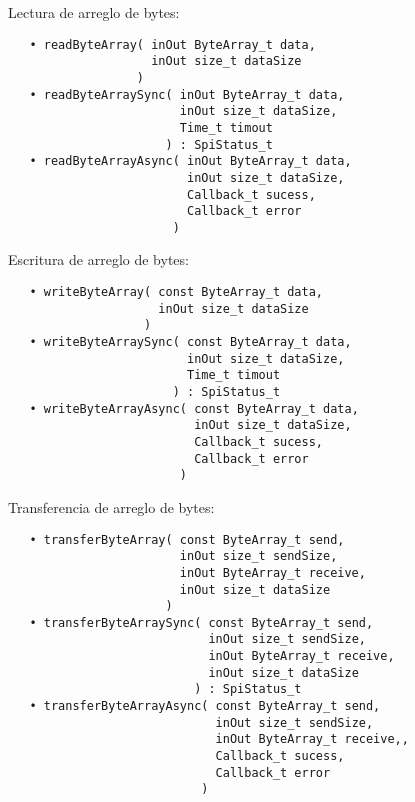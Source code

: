 

Lectura de arreglo de bytes:

\begin{verbatim}
   • readByteArray( inOut ByteArray_t data,
                    inOut size_t dataSize
                  )
   • readByteArraySync( inOut ByteArray_t data,
                        inOut size_t dataSize,
                        Time_t timout
                      ) : SpiStatus_t
   • readByteArrayAsync( inOut ByteArray_t data, 
                         inOut size_t dataSize,
                         Callback_t sucess,
                         Callback_t error 
                       )
\end{verbatim}

Escritura de arreglo de bytes:

\begin{verbatim}
   • writeByteArray( const ByteArray_t data,
                     inOut size_t dataSize
                   )
   • writeByteArraySync( const ByteArray_t data,
                         inOut size_t dataSize,
                         Time_t timout
                       ) : SpiStatus_t
   • writeByteArrayAsync( const ByteArray_t data, 
                          inOut size_t dataSize,
                          Callback_t sucess,
                          Callback_t error 
                        )
\end{verbatim}

Transferencia de arreglo de bytes:

\begin{verbatim}
   • transferByteArray( const ByteArray_t send,
                        inOut size_t sendSize,
                        inOut ByteArray_t receive,
                        inOut size_t dataSize
                      )
   • transferByteArraySync( const ByteArray_t send,
                            inOut size_t sendSize,
                            inOut ByteArray_t receive,
                            inOut size_t dataSize
                          ) : SpiStatus_t
   • transferByteArrayAsync( const ByteArray_t send,
                             inOut size_t sendSize,
                             inOut ByteArray_t receive,,
                             Callback_t sucess,
                             Callback_t error 
                           )
\end{verbatim}




